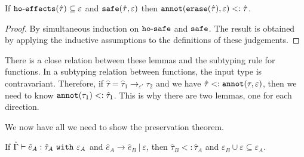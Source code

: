 \begin{lemma}
If $\mathtt{ho \hbox{-} effects}(\hat \tau) \subseteq \varepsilon$ and $\mathtt{safe}(\hat \tau, \varepsilon)$ then $\mathtt{annot(erase}(\hat \tau), \varepsilon) <: \hat \tau$.
\end{lemma}

\begin{proof}
By simultaneous induction on $\mathtt{ho \hbox{-} safe}$ and $\mathtt{safe}$. The result is obtained by applying the inductive assumptions to the definitions of these judgements.
\end{proof}

\noindent
There is a close relation between these lemmas and the subtyping rule for functions. In a subtyping relation between functions, the input type is contravariant. Therefore, if $\hat \tau = \hat \tau_1 \rightarrow_{\varepsilon'} \tau_2$ and we have $\hat \tau <: \mathtt{annot}(\tau, \varepsilon)$, then we need to know $\mathtt{annot}(\tau_1) <: \hat \tau_1$. This is why there are two lemmas, one for each direction.

We now have all we need to show the preservation theorem.

\begin{theorem}[Preservation]
If $\hat \Gamma \vdash \hat e_A: \hat \tau_A~\mathtt{with}~ \varepsilon_A$ and $\hat e_A \longrightarrow \hat e_B~|~\varepsilon$, then $\hat \tau_B <: \hat \tau_A$ and $\varepsilon_B \cup \varepsilon \subseteq \varepsilon_A$.
\end{theorem}


